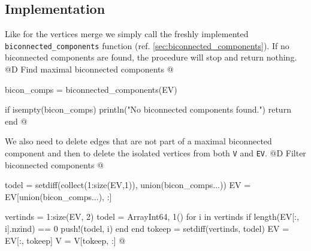 \subsection{Implementation}
Like for the vertices merge we simply call the freshly implemented \texttt{biconnected\_components} function
(ref. \ref{sec:biconnected_components}). If no biconnected components are found, the procedure will stop and return nothing.
@D Find maximal biconnected components
@{bicon_comps = biconnected_components(EV)

if isempty(bicon_comps)
    println("No biconnected components found.")
    return
end
@}
We also need to delete edges that are not part of a maximal biconnected component
and then to delete the isolated vertices from both \texttt{V} and \texttt{EV}.
@D Filter biconnected components
@{todel = setdiff(collect(1:size(EV,1)), union(bicon_comps...))
EV = EV[union(bicon_comps...), :]

vertinds = 1:size(EV, 2)
todel = Array{Int64, 1}()
for i in vertinds
    if length(EV[:, i].nzind) == 0
        push!(todel, i)
    end
end
tokeep = setdiff(vertinds, todel)
EV = EV[:, tokeep]
V = V[tokeep, :]
@}

